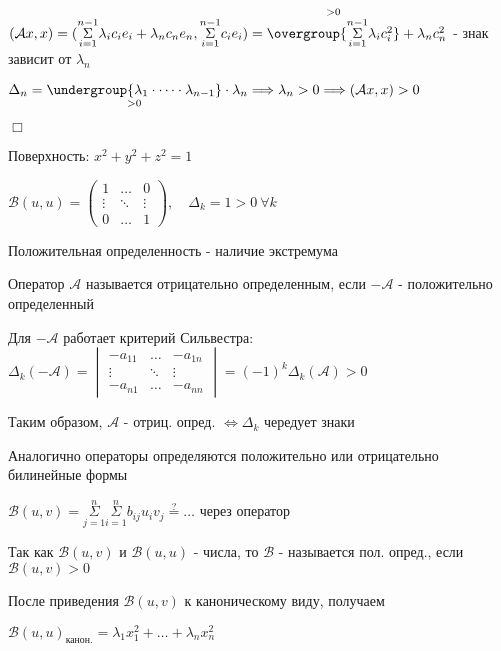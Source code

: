 \documentclass[12pt]{article}
\begin{document}
    $(\mathcal{A}x, x) = (\overset{n - 1}{\underset{i = 1}{\Sigma}} \lambda_i c_i e_i + \lambda_n c_n e_n,
    \overset{n - 1}{\underset{i = 1}{\Sigma}} c_i e_i) = \overset{> 0}{\overgroup{\overset{n - 1}{\underset{i = 1}{\Sigma}} \lambda_i c_i^2}} + \lambda_n c_n^2$ - знак зависит от $\lambda_n$

    $\Delta_n = \underset{> 0}{\undergroup{\lambda_1 \cdot \dots \cdot \lambda_{n-1}}} \cdot \lambda_n
    \Longrightarrow \lambda_n > 0 \Longrightarrow (\mathcal{A}x, x) > 0$

    $\Box$

    \Ex Поверхность: $x^2 + y^2 + z^2 = 1$

    $\mathcal{B}(u, u) = \begin{pmatrix}1 & \dots & 0 \\ \vdots & \ddots & \vdots \\ 0 & \dots & 1\end{pmatrix},
    \quad \Delta_k = 1 > 0 \ \forall k$

    Положительная определенность - наличие экстремума

    \Def Оператор $\mathcal{A}$ называется отрицательно определенным, если $-\mathcal{A}$ - положительно определенный

    \Nota Для $-\mathcal{A}$ работает критерий Сильвестра: $\Delta_k(-\mathcal{A}) =
    \begin{vmatrix}-a_{11} & \dots & -a_{1n} \\ \vdots & \ddots & \vdots \\ -a_{n1} & \dots & -a_{nn}\end{vmatrix} = (-1)^k \Delta_k (\mathcal{A}) > 0$

    Таким образом, $\mathcal{A}$ - отриц. опред. $\Longleftrightarrow \Delta_k$ чередует знаки

    \Nota Аналогично операторы определяются положительно или отрицательно билинейные формы

    $\mathcal{B}(u, v) = \overset{n}{\underset{j = 1}{\Sigma}}\overset{n}{\underset{i = 1}{\Sigma}} b_{ij} u_i v_j \stackrel{?}{=} \dots$ через оператор

    Так как $\mathcal{B}(u, v)$ и  $\mathcal{B}(u, u)$ - числа, то $\mathcal{B}$ - называется пол. опред., если $\mathcal{B}(u, v) > 0$

    \Nota После приведения $\mathcal{B}(u, v)$ к каноническому виду, получаем

    $\mathcal{B}(u, u)_{\text{канон.}} = \lambda_1 x_1^2 + \dots + \lambda_n x_n^2$
\end{document}
